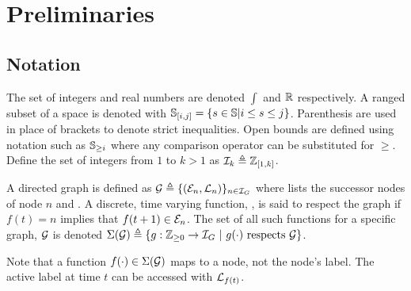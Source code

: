\section{Preliminaries}
\subsection{Notation}
The set of integers and real numbers are denoted $\int$ and $\mathbb{R}$ respectively. A ranged subset of a space is denoted with $\mathbb{S}_{[i,j]}=\{s\in\mathbb{S}|i\leq s\leq j\}$. Parenthesis are used in place of brackets to denote strict inequalities. Open bounds are defined using notation such as $\mathbb{S}_{\geq i}$ where any comparison operator can be substituted for $\geq$. Define the set of integers from $1$ to $k>1$ as $\mathcal{I}_{k}\triangleq\mathbb{Z}_{[1,k]}$.

A directed graph  is defined as $\graph\triangleq\{(\gnodeedges{n},\gnodelabel{n})\}_{n\in\idxset{\gnumnodes}}$ where  lists the successor nodes of node $n$ and . A discrete, time varying function, , is said to respect the graph if $f(t)=n$ implies that $f(t+1)\in\gnodeedges{n}$. The set of all such functions for a specific graph, $\mathcal{G}$ is denoted $\Sigma(\mathcal{G})\triangleq\{g:\int\rgeq{0}\rightarrow\idxset{\gnumnodes}\ |\ g(\cdot)\text{ respects }\graph\}$. 
\begin{remark}
Note that a function $f(\cdot)\in\Sigma(\mathcal{G})$ maps to a node, not the node's label. The active label at time $t$ can be accessed with $\mathcal{L}_{f(t)}$. 
\end{remark}

